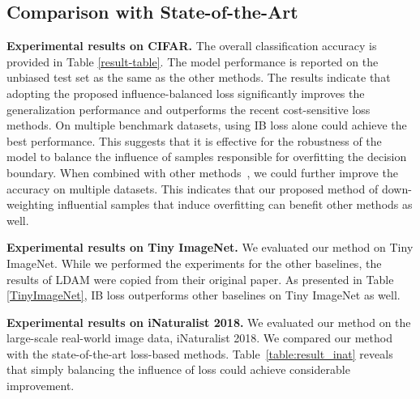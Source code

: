  





\subsection{Comparison with State-of-the-Art}
\vspace{-1mm}



\textbf{Experimental results on CIFAR.}
The overall classification accuracy is provided in Table \ref{result-table}.
The model performance is reported on the unbiased test set as the same as the other methods.
The results indicate that adopting the proposed influence-balanced loss significantly improves the generalization performance and outperforms the recent cost-sensitive loss methods. 
On multiple benchmark datasets, using IB loss alone could achieve the best performance.
This suggests that it is effective for the robustness of the model to balance the influence of samples responsible for overfitting the decision boundary.
When combined with other methods~\cite{ref:cui_belongie_cvpr19, ref:lin_focal_loss_iccv17}, we could further improve the accuracy on multiple datasets.
This indicates that our proposed method of down-weighting influential samples that induce overfitting can benefit other methods as well. \vspace{1mm}

\textbf{Experimental results on Tiny ImageNet.}
We evaluated our method on Tiny ImageNet.
While we performed the experiments for the other baselines, the results of LDAM were copied from their original paper.
As presented in Table \ref{TinyImageNet}, IB loss outperforms other baselines on Tiny ImageNet as well.




\textbf{Experimental results on iNaturalist 2018.}
We evaluated our method on the large-scale real-world image data, iNaturalist 2018.
We compared our method with the state-of-the-art loss-based methods. 
Table~\ref{table:result_inat} reveals that simply balancing the influence of loss could achieve considerable improvement. 


